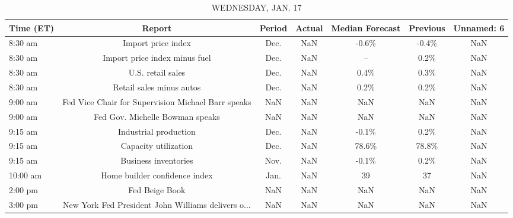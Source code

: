 \documentclass{article}%
\begin{document}
\begin{table}[htbp]%
\caption{WEDNESDAY, JAN. 17}%
\centering%
\begin{adjustbox}{width=1\textwidth}%
\begin{tabular}{lcccccc}
\toprule
Time (ET) &                                             Report & Period & Actual & Median Forecast & Previous & Unnamed: 6 \\
\midrule
  8:30 am &                                 Import price index &   Dec. &    NaN &           -0.6\% &    -0.4\% &        NaN \\
  8:30 am &                      Import price index minus fuel &   Dec. &    NaN &              -- &     0.2\% &        NaN \\
  8:30 am &                                  U.S. retail sales &   Dec. &    NaN &            0.4\% &     0.3\% &        NaN \\
  8:30 am &                           Retail sales minus autos &   Dec. &    NaN &            0.2\% &     0.2\% &        NaN \\
  9:00 am & Fed Vice Chair for Supervision Michael Barr speaks &    NaN &    NaN &             NaN &      NaN &        NaN \\
  9:00 am &                    Fed Gov. Michelle Bowman speaks &    NaN &    NaN &             NaN &      NaN &        NaN \\
  9:15 am &                              Industrial production &   Dec. &    NaN &           -0.1\% &     0.2\% &        NaN \\
  9:15 am &                               Capacity utilization &   Dec. &    NaN &           78.6\% &    78.8\% &        NaN \\
  9:15 am &                               Business inventories &   Nov. &    NaN &           -0.1\% &     0.2\% &        NaN \\
 10:00 am &                      Home builder confidence index &   Jan. &    NaN &              39 &       37 &        NaN \\
  2:00 pm &                                     Fed Beige Book &    NaN &    NaN &             NaN &      NaN &        NaN \\
  3:00 pm & New York Fed President John Williams delivers o... &    NaN &    NaN &             NaN &      NaN &        NaN \\
\bottomrule
\end{tabular}
%
\end{adjustbox}%
\end{table}
\end{document}
